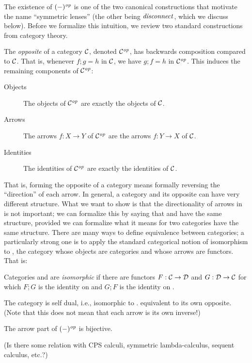 \begin{defn}[$R$-similarity]
\begin{theorem}
\begin{lemma}
\ifdissertation
The existence of $(-)^\mathit{op}$ is one of the two canonical constructions that
motivate the name ``symmetric lenses'' (the other being $\mathit{disconnect}$, which
we discuss below). Before we formalize this intuition, we review two
standard constructions from category theory.
\begin{definition}
    The \emph{opposite} of a category $\mathcal C$, denoted $\mathcal C^\mathit{op}$, has
    backwards composition compared to $\mathcal C$. That is, whenever $f;g=h$ in
    $\mathcal C$, we have $g;f=h$ in $\mathcal C^\mathit{op}$. This induces the remaining
    components of $\mathcal C^\mathit{op}$:
    \begin{description}
        \item[Objects] The objects of $\mathcal C^\mathit{op}$ are exactly the objects of
            $\mathcal C$.
        \item[Arrows] The arrows $f : X \to Y$ of $\mathcal C^\mathit{op}$ are the arrows
            $f : Y \to X$ of $\mathcal C$.
        \item[Identities] The identities of $\mathcal C^\mathit{op}$ are exactly the
            identities of $\mathcal C$.
    \end{description}
\end{definition}
That is, forming the opposite of a category means formally reversing the
``direction'' of each arrow. In general, a category and its opposite can
have very different structure. What we want to show is that the
directionality of arrows in \LENS is not important; we can formalize this by
saying that \LENS and \LENSop have the same structure, provided we can
formalize what it means for two categories have the same structure. There
are many ways to define equivalence between categories; a particularly
strong one is to apply the standard categorical notion of isomorphism to
\CAT, the category whose objects are categories and whose arrows are
functors. That is:
\begin{definition}
    Categories \catC and \catD are \emph{isomorphic} if there are functors
    $F : \mathcal C \to \mathcal D$ and $G : \mathcal D \to \mathcal C$ for which $F;G$ is the
    identity on \catC and $G;F$ is the identity on \catD.
\end{definition}
\fi%

\begin{corollary}\label{self_duality}
The category \LENS is self dual, i.e., \ifdissertation isomorphic to
\LENSop. \else equivalent to its own opposite. \fi (Note that this does not
mean that each arrow is its own inverse!)
\end{corollary}
\begin{pf}
The arrow part of $(-)^\mathit{op}$ is bijective.
\end{pf}
\iflater\finish(Is there  some relation with CPS calculi, symmetric
lambda-calculus, sequent calculus, etc.?)  \fi


\end{lemma}
\end{theorem}
\end{defn}
